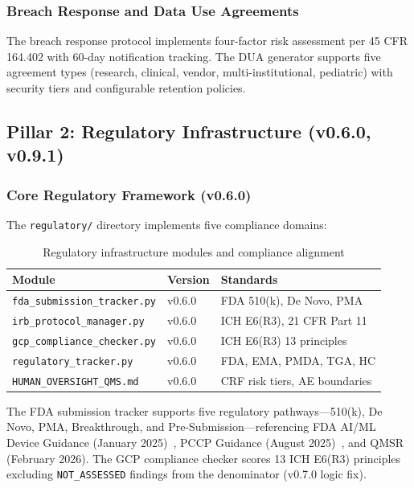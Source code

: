 \subsubsection{Breach Response and Data Use Agreements}

The breach response protocol implements four-factor risk assessment per 45 CFR 164.402 with 60-day notification tracking. The DUA generator supports five agreement types (research, clinical, vendor, multi-institutional, pediatric) with security tiers and configurable retention policies.

\subsection{Pillar 2: Regulatory Infrastructure (v0.6.0, v0.9.1)}
\label{sec:regulatory}

\subsubsection{Core Regulatory Framework (v0.6.0)}

The \texttt{regulatory/} directory implements five compliance domains:

\begin{table}[H]
\centering
\caption{Regulatory infrastructure modules and compliance alignment}
\label{tab:regulatory}
\small
\begin{tabular}{@{}lll@{}}
\toprule
\textbf{Module} & \textbf{Version} & \textbf{Standards} \\
\midrule
\texttt{fda\_submission\_tracker.py} & v0.6.0 & FDA 510(k), De Novo, PMA \\
\texttt{irb\_protocol\_manager.py} & v0.6.0 & ICH E6(R3), 21 CFR Part 11 \\
\texttt{gcp\_compliance\_checker.py} & v0.6.0 & ICH E6(R3) 13 principles \\
\texttt{regulatory\_tracker.py} & v0.6.0 & FDA, EMA, PMDA, TGA, HC \\
\texttt{HUMAN\_OVERSIGHT\_QMS.md} & v0.6.0 & CRF risk tiers, AE boundaries \\
\bottomrule
\end{tabular}
\end{table}

The FDA submission tracker supports five regulatory pathways---510(k), De Novo, PMA, Breakthrough, and Pre-Submission---referencing FDA AI/ML Device Guidance (January 2025)~\cite{fda2025aiml}, PCCP Guidance (August 2025)~\cite{fda2025pccp}, and QMSR (February 2026). The GCP compliance checker scores 13 ICH E6(R3) principles~\cite{ich2025e6r3} excluding \texttt{NOT\_ASSESSED} findings from the denominator (v0.7.0 logic fix).

